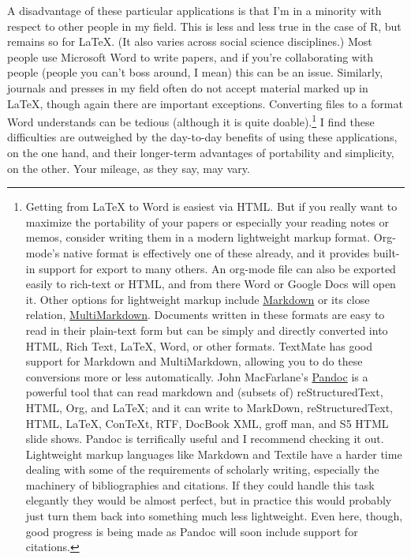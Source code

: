 \documentclass[11pt,article,oneside]{memoir}
\begin{document}
A disadvantage of these particular applications is that I'm in a
minority with respect to other people in my field. This is less and
less true in the case of R, but remains so for \LaTeX{}. (It also
varies across social science disciplines.) Most people use Microsoft
Word to write papers, and if you're collaborating with people (people
you can't boss around, I mean) this can be an issue. Similarly,
journals and presses in my field often do not accept material marked
up in \LaTeX{}, though again there are important
exceptions. Converting files to a format Word understands can be
tedious (although it is quite doable).\footnote{Getting from \LaTeX{}
  to Word is easiest via HTML. But if you really want to maximize the
  portability of your papers or especially your reading notes or
  memos, consider writing them in a modern lightweight markup
  format. Org-mode's native format is effectively one of these
  already, and it provides built-in support for export to many
  others. An org-mode file can also be exported easily to rich-text or
  HTML, and from there Word or Google Docs will open it. Other options
  for lightweight markup include
  \href{http://en.wikipedia.org/wiki/Markdown}{Markdown} or its close
  relation,
  \href{http://fletcherpenney.net/MultiMarkdown}{MultiMarkdown}. Documents
  written in these formats are easy to read in their plain-text form
  but can be simply and directly converted into HTML, Rich Text,
  \LaTeX{}, Word, or other formats. TextMate has good support for
  Markdown and MultiMarkdown, allowing you to do these conversions
  more or less automatically. John MacFarlane's
  \href{http://johnmacfarlane.net/pandoc/}{Pandoc} is a powerful tool
  that can read markdown and (subsets of) reStructuredText, HTML, Org,
  and \LaTeX{}; and it can write to MarkDown, reStructuredText, HTML,
  \LaTeX{}, ConTeXt, RTF, DocBook XML, groff man, and S5 HTML slide
  shows. Pandoc is terrifically useful and I recommend checking it
  out. Lightweight markup languages like Markdown and Textile have a
  harder time dealing with some of the requirements of scholarly
  writing, especially the machinery of bibliographies and
  citations. If they could handle this task elegantly they would be
  almost perfect, but in practice this would probably just turn them
  back into something much less lightweight. Even here, though, good
  progress is being made as Pandoc will soon include support for
  citations. } I find these difficulties are outweighed by the
day-to-day benefits of using these applications, on the one hand, and
their longer-term advantages of portability and simplicity, on the
other. Your mileage, as they say, may vary.
\end{document}
